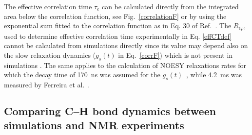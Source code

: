 \documentclass[aps,prl,superscriptaddress,twocolumn]{revtex4}
\begin{document}
The effective correlation time $\tau_e$ can be calculated directly from the integrated area below the correlation 
function, see Fig.~\ref{correlationF} or by using the exponential sum fitted to the correlation function as  
in Eq. 30 of Ref.~\cite{ferreira15}. The $R_{1\rho}$, used to determine effective correlation time experimentally 
in Eq. \ref{effCTdef} cannot be calculated from simulations directly since its value may depend
also on the slow relaxation dynamics ($g_s(t)$ in Eq.~\ref{corrF}) which is not present in simulations \cite{ferreira15}.
The same applies to the calculation of NOESY relaxations rates for which the decay time of 170~ns was assumed for the
$g_s(t)$~\cite{feller99}, while 4.2~ms was measured by Ferreira et al.~\cite{ferreira15}.



\subsection{Comparing C--H bond dynamics between simulations and NMR experiments}
\end{document}
